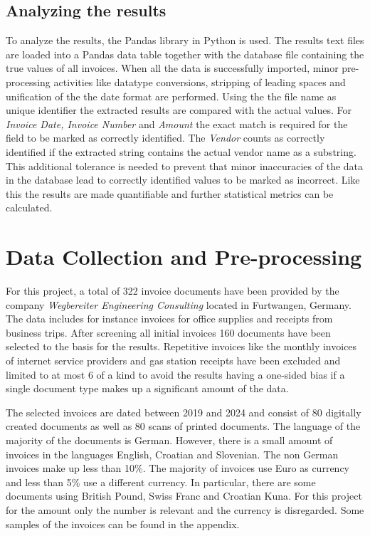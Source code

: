 \subsection{Analyzing the results}
To analyze the results, the Pandas library in Python is used. The results text files are loaded into a Pandas data table together with the database file
containing the true values of all invoices. When all the data is successfully imported, minor pre-processing activities like datatype conversions, stripping of leading spaces and unification of the the date format are performed.
Using the the file name as unique identifier the extracted results are compared with the actual values. For \textit{Invoice Date, Invoice Number}
and \textit{Amount} the exact match is required for the field to be marked as correctly identified. 
The \textit{Vendor} counts as correctly identified if the extracted string contains the actual vendor name as a substring. This additional tolerance is needed to prevent that minor inaccuracies of the data in the database lead to correctly identified values to be marked as incorrect.
Like this the results are made quantifiable and further statistical metrics can be calculated.

\newpage
\section{Data Collection and Pre-processing}
For this project, a total of 322 invoice documents have been provided by the company \textit{Wegbereiter Engineering Consulting} located in Furtwangen, Germany. The data includes for instance invoices for office supplies and receipts from business trips. After screening all initial invoices 160 documents have been selected to the basis for the results. Repetitive invoices like the monthly invoices of internet service providers and gas station receipts have been excluded and limited to at most 6 of a kind to avoid the results having a one-sided bias if a single document type makes up a significant amount of the data.

The selected invoices are dated between 2019 and 2024 and consist of 80 digitally created documents as well as 80 scans of printed documents. 
The language of the majority of the documents is German. However, there is a small amount of invoices in the languages English, Croatian and Slovenian. The non German invoices make up less than 10\%.
The majority of invoices use Euro as currency and less than 5\% use a different currency. In particular, there are some documents using British Pound, Swiss Franc and Croatian Kuna. For this project for the amount only the number is relevant and the currency is disregarded.
Some samples of the invoices can be found in the appendix.

